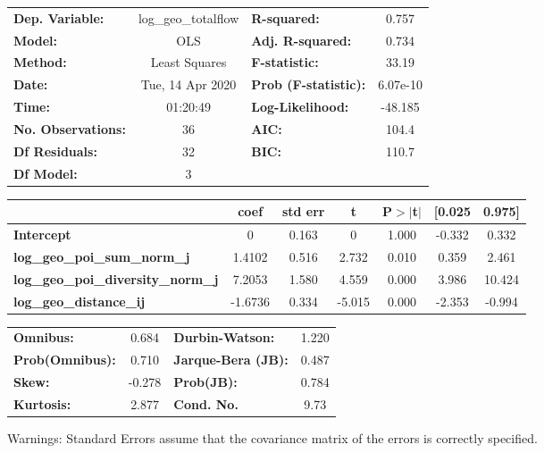 \begin{center}
\begin{tabular}{lclc}
\toprule
\textbf{Dep. Variable:}                    & log\_geo\_totalflow & \textbf{  R-squared:         } &     0.757   \\
\textbf{Model:}                            &         OLS         & \textbf{  Adj. R-squared:    } &     0.734   \\
\textbf{Method:}                           &    Least Squares    & \textbf{  F-statistic:       } &     33.19   \\
\textbf{Date:}                             &   Tue, 14 Apr 2020  & \textbf{  Prob (F-statistic):} &  6.07e-10   \\
\textbf{Time:}                             &       01:20:49      & \textbf{  Log-Likelihood:    } &   -48.185   \\
\textbf{No. Observations:}                 &            36       & \textbf{  AIC:               } &     104.4   \\
\textbf{Df Residuals:}                     &            32       & \textbf{  BIC:               } &     110.7   \\
\textbf{Df Model:}                         &             3       & \textbf{                     } &             \\
\bottomrule
\end{tabular}
\begin{tabular}{lcccccc}
                                           & \textbf{coef} & \textbf{std err} & \textbf{t} & \textbf{P$> |$t$|$} & \textbf{[0.025} & \textbf{0.975]}  \\
\midrule
\textbf{Intercept}                         &            0  &        0.163     &         0  &         1.000        &       -0.332    &        0.332     \\
\textbf{log\_geo\_poi\_sum\_norm\_j}       &       1.4102  &        0.516     &     2.732  &         0.010        &        0.359    &        2.461     \\
\textbf{log\_geo\_poi\_diversity\_norm\_j} &       7.2053  &        1.580     &     4.559  &         0.000        &        3.986    &       10.424     \\
\textbf{log\_geo\_distance\_ij}            &      -1.6736  &        0.334     &    -5.015  &         0.000        &       -2.353    &       -0.994     \\
\bottomrule
\end{tabular}
\begin{tabular}{lclc}
\textbf{Omnibus:}       &  0.684 & \textbf{  Durbin-Watson:     } &    1.220  \\
\textbf{Prob(Omnibus):} &  0.710 & \textbf{  Jarque-Bera (JB):  } &    0.487  \\
\textbf{Skew:}          & -0.278 & \textbf{  Prob(JB):          } &    0.784  \\
\textbf{Kurtosis:}      &  2.877 & \textbf{  Cond. No.          } &     9.73  \\
\bottomrule
\end{tabular}
\end{center}

Warnings: \newline
 [1] Standard Errors assume that the covariance matrix of the errors is correctly specified.